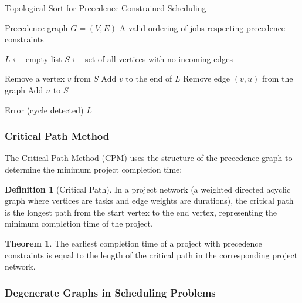 \documentclass{article}
\theoremstyle{definition}
\newtheorem{theorem}{Theorem}
\newtheorem{definition}{Definition}
\begin{document}
\begin{algorithm}
\caption{Topological Sort for Precedence-Constrained Scheduling}
\label{alg:topo-sort}
\begin{algorithmic}[1]
    \Require Precedence graph $G = (V, E)$
    \Ensure A valid ordering of jobs respecting precedence constraints
    
    \State $L \gets$ empty list
    \State $S \gets$ set of all vertices with no incoming edges
    
        \State Remove a vertex $v$ from $S$
        \State Add $v$ to the end of $L$
            \State Remove edge $(v, u)$ from the graph
                \State Add $u$ to $S$
            \EndIf
        \EndFor
    \EndWhile
    
        \State \Return Error (cycle detected)
    \Else
        \State \Return $L$
    \EndIf
\end{algorithmic}
\end{algorithm}

\subsubsection*{Critical Path Method}

The Critical Path Method (CPM) uses the structure of the precedence graph to determine the minimum project completion time:

\begin{definition}[Critical Path]
In a project network (a weighted directed acyclic graph where vertices are tasks and edge weights are durations), the critical path is the longest path from the start vertex to the end vertex, representing the minimum completion time of the project.
\end{definition}

\begin{theorem}
The earliest completion time of a project with precedence constraints is equal to the length of the critical path in the corresponding project network.
\end{theorem}

\subsubsection{Degenerate Graphs in Scheduling Problems}
\label{sec:degenerate}
\end{document}
